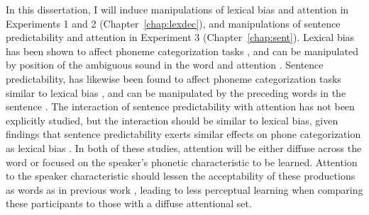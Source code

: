 In this dissertation,  I will induce manipulations of lexical bias and attention in Experiments 1 and 2 (Chapter~\ref{chap:lexdec}), and manipulations of sentence predictability and attention in Experiment 3 (Chapter~\ref{chap:sent}). 
Lexical bias has been shown to affect phoneme categorization tasks \citep{Ganong1980}, and can be manipulated by position of the ambiguous sound in the word and attention \citep{Pitt2012}.  
Sentence predictability, has likewise been found to affect phoneme categorization tasks similar to lexical bias \citep{Borsky1998}, and can be manipulated by the preceding words in the sentence \citep{Kalikow1977}.  
The interaction of sentence predictability with attention has not been explicitly studied, but the interaction should be similar to lexical bias, given findings that sentence predictability exerts similar effects on phone categorization as lexical bias \citep{Borsky1998}.  In both of these studies, attention will be either diffuse across the word or focused on the speaker's phonetic characteristic to be learned.  Attention to the speaker characteristic should lessen the acceptability of these productions as words as in previous work \citep{Pitt2012}, leading to less perceptual learning when comparing these participants to those with a diffuse attentional set.
